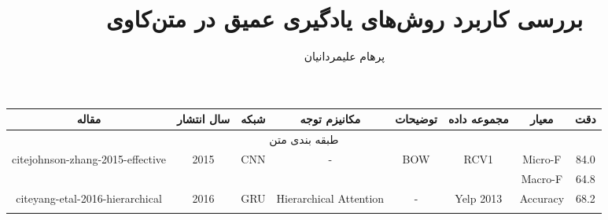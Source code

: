 \documentclass[12pt, a4paper, oneside]{report}
\title{بررسی کاربرد روش‌های یادگیری عمیق در متن‌کاوی}
\author{پرهام علیمردانیان}
\date{}
\begin{document}
\begin{tabular}{|c|c|c|c|c|c|cc|}
    \hline
    مقاله                                                                 & سال انتشار            & شبکه                              & مکانیزم توجه                            & توضیحات                                                                                                & مجموعه داده                           & \multicolumn{1}{c|}{معیار}                                                                                                         & دقت    \\ \hline
    \multicolumn{8}{|c|}{طبقه بندی متن}                                                                                                                                                                                                                                                                                                                                                                                                                                        \\ \hline
    \multirow{2}{*}{cite{johnson-zhang-2015-effective}} & \multirow{2}{*}{2015} & \multirow{2}{*}{CNN}              & \multirow{2}{*}{-}                      & \multirow{2}{*}{BOW}                                                                                   & \multirow{2}{*}{RCV1}                 & \multicolumn{1}{c|}{Micro-F}                                                                                                       & 84.0   \\ \cline{7-8} 
                                                                          &                       &                                   &                                         &                                                                                                        &                                       & \multicolumn{1}{c|}{Macro-F}                                                                                                       & 64.8   \\ \hline
    \multirow{6}{*}{cite{yang-etal-2016-hierarchical}}  & \multirow{6}{*}{2016} & \multirow{6}{*}{GRU}              & \multirow{6}{*}{Hierarchical Attention} & \multirow{6}{*}{-}                                                                                     & Yelp 2013                             & \multicolumn{1}{c|}{\multirow{6}{*}{Accuracy}}                                                                                     & 68.2   \\ \cline{6-6} \cline{8-8} 

\end{tabular}
\end{document}
